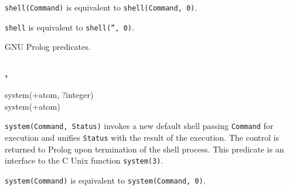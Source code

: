 \texttt{shell(Command)} is equivalent to \texttt{shell(Command, 0)}.

\texttt{shell} is equivalent to \texttt{shell('', 0)}.

\begin{PlErrors}




\end{PlErrors}

\Portability

GNU Prolog predicates.

\subsubsection{,
               }

\begin{TemplatesOneCol}
system(+atom, ?integer)\\
system(+atom)

\end{TemplatesOneCol}

\Description

\texttt{system(Command, Status)} invokes a new default shell passing
\texttt{Command} for execution and unifies \texttt{Status} with the result
of the execution. The control is returned to Prolog upon termination of the
shell process. This predicate is an interface to the C Unix function
\texttt{system(3)}.

\texttt{system(Command)} is equivalent to \texttt{system(Command, 0)}.

\begin{PlErrors}




\end{PlErrors}

\Portability

